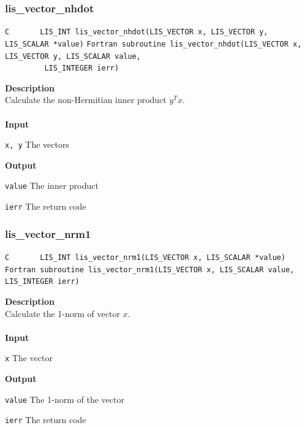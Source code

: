 \documentclass[a4paper]{article}
\newcommand{\namelistlabel}[1]{\mbox{#1}\hfill}
\newenvironment{namelist}[1]{%
\begin{list}{}
  {\let\makelabel\namelistlabel
  \settowidth{\labelwidth}{#1}
  \setlength{\leftmargin}{1.1\labelwidth}}
  }{%
\end{list}}
\begin{document}
\subsubsection{lis\_vector\_nhdot}
\begin{screen}
\verb|C       LIS_INT lis_vector_nhdot(LIS_VECTOR x, LIS_VECTOR y, LIS_SCALAR *value)|
\verb|Fortran subroutine lis_vector_nhdot(LIS_VECTOR x, LIS_VECTOR y, LIS_SCALAR value,|\\
\verb|         LIS_INTEGER ierr)|
\end{screen}
{\bf Description}\\
\indent
Calculate the non-Hermitian inner product $y^{T}x$.
\\ \\
\noindent
{\bf Input}
\begin{namelist}{XXXXXXXXXXXXXXXXXXXX}
\item[\tt x, y] The vectors
\end{namelist}
{\bf Output}
\begin{namelist}{XXXXXXXXXXXXXXXXXXXX}
\item[\tt value] The inner product
\item[\tt ierr] The return code
\end{namelist}

\newpage
\subsubsection{lis\_vector\_nrm1}
\begin{screen}
\verb|C       LIS_INT lis_vector_nrm1(LIS_VECTOR x, LIS_SCALAR *value)|\\
\verb|Fortran subroutine lis_vector_nrm1(LIS_VECTOR x, LIS_SCALAR value, LIS_INTEGER ierr)|
\end{screen}
{\bf Description}\\
\indent
Calculate the 1-norm of vector $x$.
\\ \\
\noindent
{\bf Input}
\begin{namelist}{XXXXXXXXXXXXXXXXXXXX}
\item[\tt x] The vector
\end{namelist}
{\bf Output}
\begin{namelist}{XXXXXXXXXXXXXXXXXXXX}
\item[\tt value] The 1-norm of the vector
\item[\tt ierr] The return code
\end{namelist}
\end{document}
